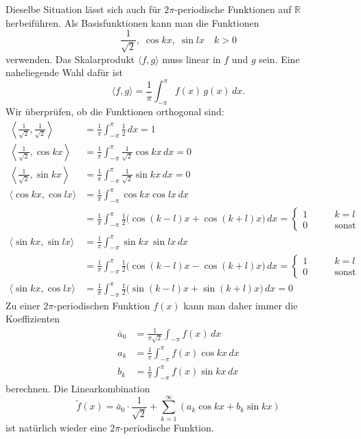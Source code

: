 Dieselbe Situation lässt sich auch für $2\pi$-periodische Funktionen 
auf $\mathbb R$ herbeiführen.
Als Basisfunktionen kann man die Funktionen 
\begin{equation}
\frac{1}{\!\sqrt{2}},\; \cos kx,\; \sin lx\quad k>0
\label{fourier:basis}
\end{equation}
verwenden.
Das Skalarprodukt $\langle f,g\rangle$ muss linear in $f$ und $g$ sein.
Eine naheliegende Wahl dafür ist
\[
\langle f, g\rangle
=
\frac{1}{\pi}\int_{-\pi}^{\pi} f(x)\,g(x)\,dx.
\]
Wir überprüfen, ob die Funktionen orthogonal sind:
\begin{align*}
\left\langle \frac1{\!\sqrt{2}},\frac1{\!\sqrt{2}}\right\rangle
&=
\frac1{\pi}
\int_{-\pi}^{\pi} \frac12\,dx
=
1
\\
\left\langle \frac1{\!\sqrt{2}},\cos kx\right\rangle
&=
\frac1{\pi}\int_{-\pi}^{\pi}
\frac1{\!\sqrt{2}}\cos kx
\,dx
=0
\\
\left\langle \frac1{\!\sqrt{2}},\sin kx\right\rangle
&=
\frac1{\pi}\int_{-\pi}^{\pi}
\frac1{\!\sqrt{2}}\sin kx
\,dx
=0
\\
\langle \cos kx,\cos lx\rangle
&=
\frac1{\pi}
\int_{-\pi}^\pi \cos kx\cos lx\,dx
\\
&=
\frac1{\pi}
\int_{-\pi}^\pi
\frac12\bigl(
\cos (k-l)x+\cos (k+l)x
\bigr)
\,dx
=
\begin{cases}
1&\qquad k=l\\
0&\qquad\text{sonst}
\end{cases}
\\
\langle \sin kx,\sin lx\rangle
&=
\frac1{\pi}
\int_{-\pi}^\pi \sin kx\,\sin lx\,dx
\\
&=
\frac1{\pi}
\int_{-\pi}^\pi
\frac12
\bigl(
\cos (k-l)x - \cos (k+l)x
\bigr)
\,dx
=
\begin{cases}
1&\qquad k=l\\
0&\qquad\text{sonst}
\end{cases}
\\
\langle \sin kx,\cos lx\rangle
&=
\frac1{\pi}
\int_{-\pi}^{\pi} 
\frac12\bigl(
\sin (k-l)x + \sin (k+l)x
\bigr)
\,dx
=0
\end{align*}
Zu einer $2\pi$-periodischen Funktion $f(x)$ kann man daher immer
die Koeffizienten
\begin{equation}
\begin{aligned}
\bar{a}_0&=\frac1{\pi\!\sqrt{2}}\int_{-\pi}f(x)\,dx
\\
a_k&=\frac1{\pi}\int_{-\pi}^\pi f(x)\cos kx\,dx
\\
b_k&=\frac1{\pi}\int_{-\pi}^\pi f(x)\sin kx\,dx
\end{aligned}
\label{fourier:normalekoeffizienten}
\end{equation}
berechnen.
Die Linearkombination
\begin{equation}
\tilde f(x)
=
\bar{a}_0\cdot\frac1{\!\sqrt{2}}
+ 
\sum_{k=1}^\infty (a_k\cos kx+b_k\sin kx)
\label{fourier:reihe}
\end{equation}
ist natürlich wieder eine $2\pi$-periodische Funktion.

